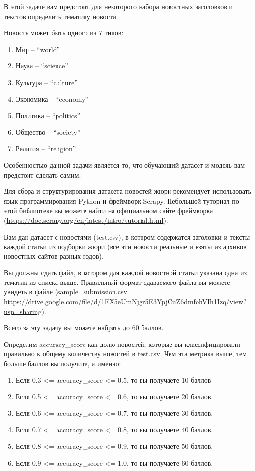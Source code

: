 
В этой задаче вам предстоит для некоторого набора новостных заголовков и текстов определить тематику новости.

Новость может быть одного из 7 типов:

\begin{enumerate}
    \item Мир -- “world”
    \item Наука -- “science”
    \item Культура -- “culture”
    \item Экономика -- “economy”
    \item Политика -- “politics”
    \item Общество -- “society”
    \item Религия -- “religion”
\end{enumerate}

Особенностью данной задачи является то, что обучающий датасет и модель вам предстоит сделать самим.

Для сбора и структурирования датасета новостей жюри рекомендует использовать язык программирования 
Python и фреймворк Scrapy. Небольшой туториал по этой библиотеке вы можете найти на официальном 
сайте фреймворка (\url{https://doc.scrapy.org/en/latest/intro/tutorial.html}).


Вам дан датасет с новостями (test.csv), в котором содержатся заголовки и тексты каждой статьи из подборки жюри (все эти новости реальные и взяты из архивов новостных сайтов разных годов).

\outputfmtSection

Вы должны сдать файл, в котором для каждой новостной статьи указана одна из тематик из списка выше. 
Правильный формат сдаваемого файла вы можете увидеть в файле (sample\_submission.csv\\ \url{https://drive.google.com/file/d/1EX5eUmNjgr5E3YpjCuZ6dmfohVIh1Izq/view?usp=sharing}).

\markSection

Всего за эту задачу вы можете набрать до 60 баллов.

Определим accuracy\_score как долю новостей, которые вы классифицировали правильно к общему количеству новостей в test.csv. Чем эта метрика выше, тем больше баллов вы получите, а именно:

\begin{enumerate}
    \item Если 0.3 <= accuracy\_score <= 0.5, то вы получаете 10 баллов
    \item Если 0.5 <= accuracy\_score <= 0.6, то вы получаете 20 баллов.
    \item Если 0.6 <= accuracy\_score <= 0.7, то вы получаете 30 баллов.
    \item Если 0.7 <= accuracy\_score <= 0.8, то вы получаете 40 баллов.
    \item Если 0.8 <= accuracy\_score <= 0.9, то вы получаете 50 баллов.
    \item Если 0.9 <= accuracy\_score <= 1.0, то вы получаете 60 баллов.
\end{enumerate}

